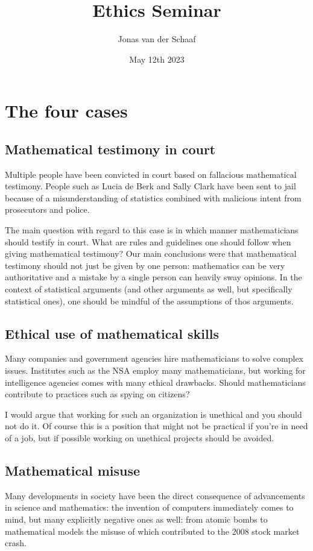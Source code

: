 \documentclass{article}
\title{Ethics Seminar}
\author{Jonas van der Schaaf}
\date{May 12th 2023}
\begin{document}
\maketitle

\section*{The four cases}
\subsection*{Mathematical testimony in court}
Multiple people have been convicted in court based on fallacious mathematical
testimony. People such as Lucia de Berk and Sally Clark have been sent to jail
because of a misunderstanding of statistics combined with malicious intent from
prosecutors and police.

The main question with regard to this case is in which manner mathematicians
should testify in court. What are rules and guidelines one should follow when
giving mathematical testimony? Our main conclusions were that mathematical
testimony should not just be given by one person: mathematics can be very
authoritative and a mistake by a single person can heavily sway opinions. In the
context of statistical arguments (and other arguments as well, but specifically
statistical ones), one should be mindful of the assumptions of thos arguments.

\subsection*{Ethical use of mathematical skills}
Many companies and government agencies hire mathematicians to solve complex
issues. Institutes such as the NSA employ many mathematicians, but working for
intelligence agencies comes with many ethical drawbacks. Should mathematicians
contribute to practices such as spying on citizens?

I would argue that working for such an organization is unethical and you should
not do it. Of course this is a position that might not be practical if you're in
need of a job, but if possible working on unethical projects should be avoided.

\subsection*{Mathematical misuse}
Many developments in society have been the direct consequence of advancements in
science and mathematics: the invention of computers immediately comes to mind,
but many explicitly negative ones as well: from atomic bombs to mathematical
models the misuse of which contributed to the 2008 stock market crash.
\end{document}
